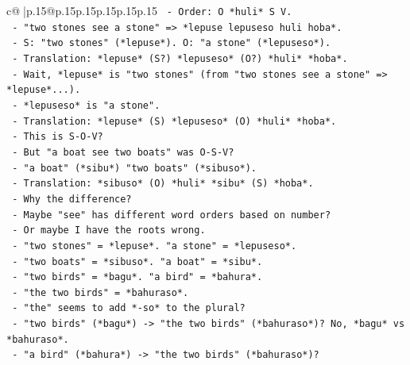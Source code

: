 \documentclass{article}
\begin{document}
{\begin{supertabular}{c@{$\;$}|p{.15\linewidth}@{}p{.15\linewidth}p{.15\linewidth}p{.15\linewidth}p{.15\linewidth}p{.15\linewidth}}
{{{\texttt{                            {-} Order: O *huli* S V.} \\
\texttt{                          {-} "two stones see a stone" => *lepuse lepuseso huli hoba*.} \\
\texttt{                            {-} S: "two stones" (*lepuse*). O: "a stone" (*lepuseso*).} \\
\texttt{                            {-} Translation: *lepuse* (S?) *lepuseso* (O?) *huli* *hoba*.} \\
\texttt{                            {-} Wait, *lepuse* is "two stones" (from "two stones see a stone" => *lepuse*...).} \\
\texttt{                            {-} *lepuseso* is "a stone".} \\
\texttt{                            {-} Translation: *lepuse* (S) *lepuseso* (O) *huli* *hoba*.} \\
\texttt{                            {-} This is S{-}O{-}V?} \\
\texttt{                            {-} But "a boat see two boats" was O{-}S{-}V?} \\
\texttt{                            {-} "a boat" (*sibu*) "two boats" (*sibuso*).} \\
\texttt{                            {-} Translation: *sibuso* (O) *huli* *sibu* (S) *hoba*.} \\
\texttt{                            {-} Why the difference?} \\
\texttt{                            {-} Maybe "see" has different word orders based on number?} \\
\texttt{                            {-} Or maybe I have the roots wrong.} \\
\texttt{                            {-} "two stones" = *lepuse*. "a stone" = *lepuseso*.} \\
\texttt{                            {-} "two boats" = *sibuso*. "a boat" = *sibu*.} \\
\texttt{                            {-} "two birds" = *bagu*. "a bird" = *bahura*.} \\
\texttt{                            {-} "the two birds" = *bahuraso*.} \\
\texttt{                            {-} "the" seems to add *{-}so* to the plural?} \\
\texttt{                            {-} "two birds" (*bagu*) {-}> "the two birds" (*bahuraso*)? No, *bagu* vs *bahuraso*.} \\
\texttt{                            {-} "a bird" (*bahura*) {-}> "the two birds" (*bahuraso*)?} \\
}}}
\end{supertabular}}
\end{document}

